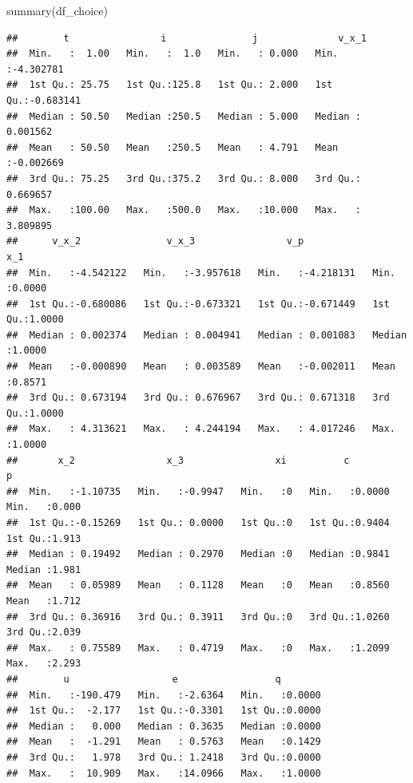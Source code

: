 \documentclass[
]{book}
\newenvironment{Shaded}{\begin{snugshade}}{\end{snugshade}}
\newcommand{\FunctionTok}[1]{\textcolor[rgb]{0.00,0.00,0.00}{#1}}
\newcommand{\NormalTok}[1]{#1}
\begin{document}
\begin{Shaded}
\begin{Highlighting}[]
\FunctionTok{summary}\NormalTok{(df\_choice)}
\end{Highlighting}
\end{Shaded}

\begin{verbatim}
##        t                i               j              v_x_1          
##  Min.   :  1.00   Min.   :  1.0   Min.   : 0.000   Min.   :-4.302781  
##  1st Qu.: 25.75   1st Qu.:125.8   1st Qu.: 2.000   1st Qu.:-0.683141  
##  Median : 50.50   Median :250.5   Median : 5.000   Median : 0.001562  
##  Mean   : 50.50   Mean   :250.5   Mean   : 4.791   Mean   :-0.002669  
##  3rd Qu.: 75.25   3rd Qu.:375.2   3rd Qu.: 8.000   3rd Qu.: 0.669657  
##  Max.   :100.00   Max.   :500.0   Max.   :10.000   Max.   : 3.809895  
##      v_x_2               v_x_3                v_p                 x_1        
##  Min.   :-4.542122   Min.   :-3.957618   Min.   :-4.218131   Min.   :0.0000  
##  1st Qu.:-0.680086   1st Qu.:-0.673321   1st Qu.:-0.671449   1st Qu.:1.0000  
##  Median : 0.002374   Median : 0.004941   Median : 0.001083   Median :1.0000  
##  Mean   :-0.000890   Mean   : 0.003589   Mean   :-0.002011   Mean   :0.8571  
##  3rd Qu.: 0.673194   3rd Qu.: 0.676967   3rd Qu.: 0.671318   3rd Qu.:1.0000  
##  Max.   : 4.313621   Max.   : 4.244194   Max.   : 4.017246   Max.   :1.0000  
##       x_2                x_3                xi          c                p        
##  Min.   :-1.10735   Min.   :-0.9947   Min.   :0   Min.   :0.0000   Min.   :0.000  
##  1st Qu.:-0.15269   1st Qu.: 0.0000   1st Qu.:0   1st Qu.:0.9404   1st Qu.:1.913  
##  Median : 0.19492   Median : 0.2970   Median :0   Median :0.9841   Median :1.981  
##  Mean   : 0.05989   Mean   : 0.1128   Mean   :0   Mean   :0.8560   Mean   :1.712  
##  3rd Qu.: 0.36916   3rd Qu.: 0.3911   3rd Qu.:0   3rd Qu.:1.0260   3rd Qu.:2.039  
##  Max.   : 0.75589   Max.   : 0.4719   Max.   :0   Max.   :1.2099   Max.   :2.293  
##        u                  e                 q         
##  Min.   :-190.479   Min.   :-2.6364   Min.   :0.0000  
##  1st Qu.:  -2.177   1st Qu.:-0.3301   1st Qu.:0.0000  
##  Median :   0.000   Median : 0.3635   Median :0.0000  
##  Mean   :  -1.291   Mean   : 0.5763   Mean   :0.1429  
##  3rd Qu.:   1.978   3rd Qu.: 1.2418   3rd Qu.:0.0000  
##  Max.   :  10.909   Max.   :14.0966   Max.   :1.0000
\end{verbatim}
\end{document}

